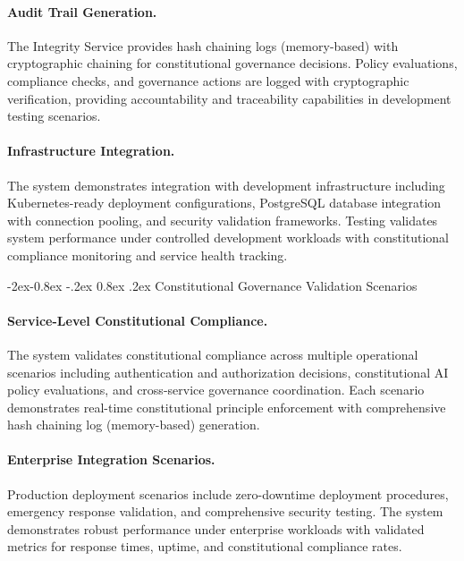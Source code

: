 \documentclass[manuscript,screen,9pt]{acmart}
\makeatletter
\renewcommand\subsubsection{\@startsection{subsubsection}{3}{\z@}%
  {-2ex\@plus -0.8ex \@minus -.2ex}%
  {0.8ex \@plus .2ex}%
  {\normalfont\normalsize\bfseries}}
\makeatother
\begin{document}
\paragraph{Audit Trail Generation.} The Integrity Service provides hash chaining logs (memory-based) with cryptographic chaining for constitutional governance decisions. Policy evaluations, compliance checks, and governance actions are logged with cryptographic verification, providing accountability and traceability capabilities in development testing scenarios.

\paragraph{Infrastructure Integration.} The system demonstrates integration with development infrastructure including Kubernetes-ready deployment configurations, PostgreSQL database integration with connection pooling, and security validation frameworks. Testing validates system performance under controlled development workloads with constitutional compliance monitoring and service health tracking.

\subsubsection{Constitutional Governance Validation Scenarios}
\label{subsubsec:governance_scenarios}

\paragraph{Service-Level Constitutional Compliance.} The system validates constitutional compliance across multiple operational scenarios including authentication and authorization decisions, constitutional AI policy evaluations, and cross-service governance coordination. Each scenario demonstrates real-time constitutional principle enforcement with comprehensive hash chaining log (memory-based) generation.

\paragraph{Enterprise Integration Scenarios.} Production deployment scenarios include zero-downtime deployment procedures, emergency response validation, and comprehensive security testing. The system demonstrates robust performance under enterprise workloads with validated metrics for response times, uptime, and constitutional compliance rates.
\end{document}
